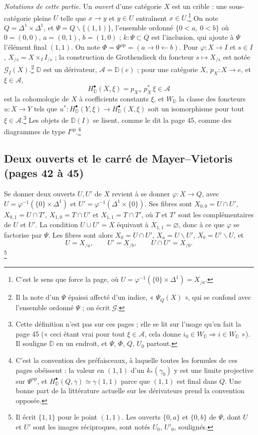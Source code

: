\documentclass[11pt,a4paper]{article}
\begin{document}
\emph{Notations de cette partie.} Un \emph{ouvert} d'une catégorie $X$ est un
crible : une sous-catégorie pleine $U$ telle que $x \to y$ et $y \in U$
entraînent $x \in U$.\footnote{C'est le sens que force la page, où
$U = \varphi^{-1}(\{0\} \times \Delta^1) = X_{/a}$.} On note
$Q = \Delta^1 \times \Delta^1$, et $\Psi = Q \smallsetminus \{(1,1)\}$,
l'ensemble ordonné $\{0 < a,\ 0 < b\}$ où $0 = (0,0)$, $a = (0,1)$, $b = (1,0)$ ;
$k : \Psi \subset Q$ est l'inclusion, qui ajoute à $\Psi$ l'élément final
$(1,1)$. On note $\Phi = \Psi^{\mathrm{op}} = (a \to 0 \leftarrow b)$. Pour
$\varphi : X \to I$ et $s \in I$, $X_{/s} = X \times_I I_{/s}$ ; la
construction de Grothendieck du foncteur $s \mapsto X_{/s}$ est notée
$\mathcal{G}_I(X)$.\footnote{Il la note d'un $\Psi$ épaissi affecté d'un
indice, « $\Psi_{Q}(X)$ », qui se confond avec l'ensemble ordonné
$\Psi$ ; on écrit $\mathcal{G}$.} $\mathbb D$ est un dérivateur,
$\mathcal{A} = \mathbb D(e)$ ; pour une catégorie $X$, $p_X : X \to e$, et
$\xi \in \mathcal{A}$,
\[
H^\bullet_{\mathbb D}(X, \xi) = p_{X*}\, p_X^*\, \xi \in \mathcal{A}
\]
est la cohomologie de $X$ à coefficients constants $\xi$, et $W_{\mathbb D}$
la classe des foncteurs $u : X \to Y$ tels que $u^* :
H^\bullet_{\mathbb D}(Y, \xi) \to H^\bullet_{\mathbb D}(X, \xi)$ soit un
isomorphisme pour tout $\xi \in \mathcal{A}$.\footnote{Cette définition n'est
pas sur ces pages ; elle se lit sur l'usage qu'en fait la page 45 (« ceci
étant vrai pour tout $\xi \in \mathcal{A}$, cela donne $i_0 \in W_{\mathbb D}
\Rightarrow i \in W_{\mathbb D}$ »). Il souligne $\mathbb D$ en un endroit, et
$\Psi$, $\Phi$, $Q$, $U_0$ partout.} Les objets de $\mathbb D(I)$ se lisent,
comme le dit la page 45, comme des diagrammes de type
$I^{\mathrm{op}}$.\footnote{C'est la convention des préfaisceaux, à laquelle
toutes les formules de ces pages obéissent : la valeur en $(1,1)$ d'un
$k_*(\gamma_0)$ y est une limite projective sur $\Psi^{\mathrm{op}}$, et
$H^\bullet_{\mathbb D}(Q, \gamma) \simeq \gamma(1,1)$ parce que $(1,1)$ est
final dans $Q$. Une bonne part de la littérature actuelle sur les dérivateurs
prend la convention opposée.}

\subsection*{Deux ouverts et le carré de Mayer--Vietoris (pages 42 à 45)}

Se donner deux ouverts $U, U'$ de $X$ revient à se donner
$\varphi : X \to Q$, avec $U = \varphi^{-1}(\{0\} \times \Delta^1)$ et
$U' = \varphi^{-1}(\Delta^1 \times \{0\})$. Ses fibres sont $X_{0,0} = U \cap
U'$, $X_{0,1} = U \cap T'$, $X_{1,0} = T \cap U'$ et $X_{1,1} = T \cap T'$,
où $T$ et $T'$ sont les complémentaires de $U$ et $U'$. La condition
$U \cup U' = X$ équivaut à $X_{1,1} = \varnothing$, donc à ce que $\varphi$ se
factorise par $\Psi$. Les fibres sont alors
$X_0 = U \cap U'$, $X_a = U \smallsetminus U'$, $X_b = U' \smallsetminus U$,
et
\[
U = X_{/a}, \qquad U' = X_{/b}, \qquad U \cap U' = X_{/0} .
\]
\footnote{Il écrit $\{1,1\}$ pour le point $(1,1)$. Les ouverts
$\{0, a\}$ et $\{0, b\}$ de $\Psi$, dont $U$ et $U'$ sont les images
réciproques, sont notés $U_0$, $U'_0$, soulignés.}
\end{document}
